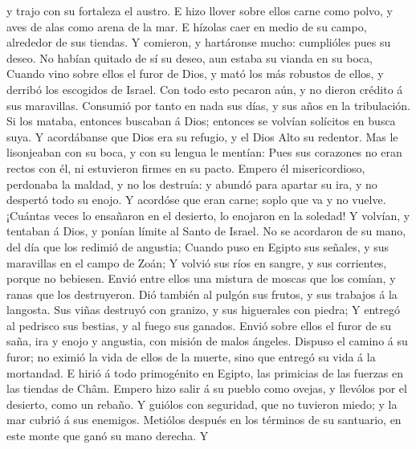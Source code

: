 y trajo con su fortaleza el austro.  E hizo llover sobre
ellos carne como polvo, y aves de alas como arena de la mar.
 E hízolas caer en medio de su campo, alrededor de sus
tiendas.  Y comieron, y hartáronse mucho: cumplióles pues
su deseo.  No habían quitado de sí su deseo, aun estaba
su vianda en su boca,  Cuando vino sobre ellos el furor
de Dios, y mató los más robustos de ellos, y derribó los escogidos de
Israel.  Con todo esto pecaron aún, y no dieron crédito á
sus maravillas.  Consumió por tanto en nada sus días, y
sus años en la tribulación.  Si los mataba, entonces
buscaban á Dios; entonces se volvían solícitos en busca suya.
 Y acordábanse que Dios era su refugio, y el Dios Alto su
redentor.  Mas le lisonjeaban con su boca, y con su
lengua le mentían:  Pues sus corazones no eran rectos con
él, ni estuvieron firmes en su pacto.  Empero él
misericordioso, perdonaba la maldad, y no los destruía: y abundó para
apartar su ira, y no despertó todo su enojo.  Y acordóse
que eran carne; soplo que va y no vuelve.  ¡Cuántas veces
lo ensañaron en el desierto, lo enojaron en la soledad! 
Y volvían, y tentaban á Dios, y ponían límite al Santo de Israel.
 No se acordaron de su mano, del día que los redimió de
angustia;  Cuando puso en Egipto sus señales, y sus
maravillas en el campo de Zoán;  Y volvió sus ríos en
sangre, y sus corrientes, porque no bebiesen.  Envió
entre ellos una mistura de moscas que los comían, y ranas que los
destruyeron.  Dió también al pulgón sus frutos, y sus
trabajos á la langosta.  Sus viñas destruyó con granizo,
y sus higuerales con piedra;  Y entregó al pedrisco sus
bestias, y al fuego sus ganados.  Envió sobre ellos el
furor de su saña, ira y enojo y angustia, con misión de malos ángeles.
 Dispuso el camino á su furor; no eximió la vida de ellos
de la muerte, sino que entregó su vida á la mortandad.  E
hirió á todo primogénito en Egipto, las primicias de las fuerzas en las
tiendas de Châm.  Empero hizo salir á su pueblo como
ovejas, y llevólos por el desierto, como un rebaño.  Y
guiólos con seguridad, que no tuvieron miedo; y la mar cubrió á sus
enemigos.  Metiólos después en los términos de su
santuario, en este monte que ganó su mano derecha.  Y
